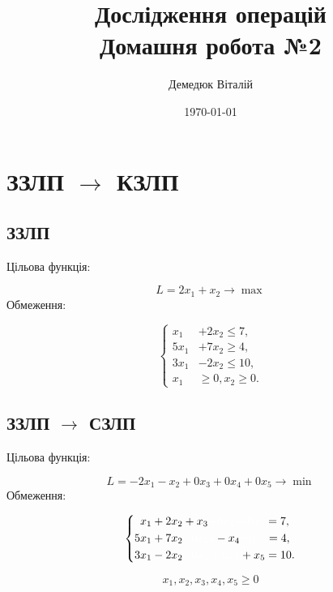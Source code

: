 \documentclass[a4paper, 12pt]{article}
\author{Демедюк Віталій}
\title{Дослідження операцій\\
	   Домашня робота №2}
\date{\today}
\begin{document}
\maketitle
\newpage

\tableofcontents


\newpage

\section{ЗЗЛП $\rightarrow$ КЗЛП}

\subsection{ЗЗЛП}

Цільова функція:

\begin{equation*}
L = 2x_1 + x_2 \rightarrow \max
\end{equation*}
Обмеження:

\begin{equation*}
\left\{
\begin{aligned}
	x_1 &+ 2x_2 \leq 7,\\
	5x_1 &+ 7x_2 \geq 4,\\
	3x_1 &- 2x_2 \leq 10,\\
	x_1 &\geq 0, x_2 \geq 0. 
\end{aligned}
\right.
\end{equation*}

\subsection{ЗЗЛП $\rightarrow$ СЗЛП}

Цільова функція:

\begin{equation*}
L = -2x_1 - x_2 + 0x_3 + 0x_4 + 0x_5 \rightarrow \min
\end{equation*}
Обмеження:

\[
\left\{
\begin{aligned}
	x_1 &+ 2x_2 + x_3 \textcolor{white}{+ 0x_4 + 0x_5} = 7,\\
	5x_1 &+ 7x_2 \textcolor{white}{+ 0x_33} - x_4 \textcolor{white}{+ 0x_5} = 4,\\
	3x_1 &- 2x_2 \textcolor{white}{+ 0x_3 + 0x_4} + x_5 = 10.\\ 
\end{aligned}
\right.
\]

\[ x_1, x_2, x_3, x_4, x_5 \geq 0 \]
\end{document}
